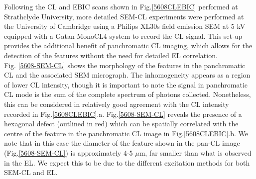 Following the CL and EBIC scans shown in Fig.\ref{5608CLEBIC} performed at Strathclyde University, more detailed SEM-CL experiments were performed at the University of Cambridge using a Philips XL30s field emission SEM at 5 kV equipped with a Gatan MonoCL4 system to record the CL signal. This set-up provides the additional benefit of panchromatic CL imaging, which allows for the detection of the features without the need for detailed EL correlation.\\
Fig. \ref{5608-SEM-CL} shows the morphology of the features in the panchromatic CL and the associated SEM micrograph. The inhomogeneity appears as a region of lower CL intensity, though it is important to note the signal in panchromatic CL mode is the sum of the complete spectrum of photons collected. Nonetheless, this can be considered in relatively good agreement with the CL intensity recorded in Fig.\ref{5608CLEBIC}.a. Fig.\ref{5608-SEM-CL} reveals the presence of a hexagonal defect (outlined in red) which can be spatially correlated with the centre of the feature in the panchromatic CL image in Fig.\ref{5608CLEBIC}.b. We note that in this case the diameter of the feature shown in the pan-CL image (Fig.\ref{5608-SEM-CL}) is approximately 4-5 $\mu$m, far smaller than what is observed in the EL. We expect this to be due to the different excitation methods for both SEM-CL and EL.

